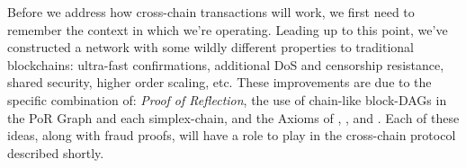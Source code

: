 Before we address how cross-chain transactions will work, we first need to remember the context in which we're operating.
Leading up to this point, we've constructed a network with some wildly different properties to traditional blockchains: ultra-fast confirmations, additional DoS and censorship resistance, shared security, higher order scaling, etc.
These improvements are due to the specific combination of: \emph{Proof of Reflection}, the use of chain-like block-DAGs in the PoR Graph and each simplex-chain, and the Axioms of \AxOfAvailability{}, \AxOfMaximalReflection{}, and \AxOfUnifiedAncestry{}.
Each of these ideas, along with fraud proofs, will have a role to play in the cross-chain protocol described shortly.

